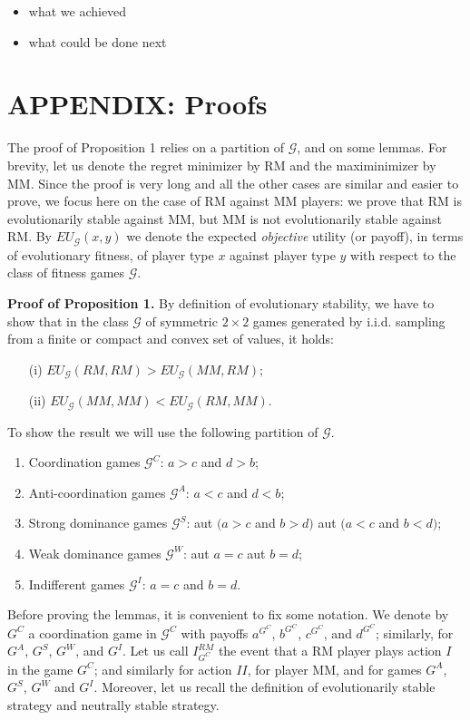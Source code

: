 \documentclass[fleqn,reqno,11pt]{article}
\begin{document}
\begin{itemize}
\item what we achieved
\item what could be done next
\end{itemize}











\section*{APPENDIX: Proofs}

The proof of Proposition 1 relies on a partition of $\mathcal{G}$,
and on some lemmas. For brevity, let us denote the regret minimizer
by RM and the maximinimizer by MM. Since the proof is very long and
all the other cases are similar and easier to prove, we focus here
on the case of RM against MM players: we prove that RM is evolutionarily
stable against MM, but MM is not evolutionarily stable against RM. By $EU_{\mathcal{G}}(x,y)$ we denote the expected \textit{objective} utility (or payoff), in terms
of evolutionary fitness, of player type $x$ against player type $y$
with respect to the class of fitness games $\mathcal{G}$. 

\medskip{}


\textbf{Proof of Proposition 1.} By definition of evolutionary stability, we have to
show that in the class $\mathcal{G}$ of symmetric $2\times2$ games generated by i.i.d. sampling
from a finite or compact and convex set of values, it holds:
\begin{itemize}
\item[(i)] $EU_{\mathcal{G}}(RM,RM)>EU_{\mathcal{G}}(MM,RM);$
\item[(ii)] $EU_{\mathcal{G}}(MM,MM)<EU_{\mathcal{G}}(RM,MM).$
\end{itemize}


\noindent To show
the result we will use the following partition of $\mathcal{G}$.
\begin{enumerate}
\item Coordination games $\mathcal{G}^{C}$: $a>c$ and $d>b$;
\item Anti-coordination games $\mathcal{G}^{A}$: $a<c$ and $d<b$;
\item Strong dominance games $\mathcal{G}^{S}$: aut $(a>c$ and $b>d)$
aut $(a<c$ and $b<d)$;
\item Weak dominance games $\mathcal{G}^{W}$: aut $a=c$ aut $b=d$;
\item Indifferent games $\mathcal{G}^{I}$: $a=c$ and $b=d$.
\end{enumerate}
Before proving the lemmas, it is convenient to fix some notation.
We denote by $G^{C}$ a coordination game in $\mathcal{G}^{C}$ with
payoffs $a^{G^{C}}$, $b^{G^{C}}$, $c^{G^{C}}$, and $d^{G^{C}}$;
similarly, for $G^{A}$, $G^{S}$, $G^{W}$, and $G^{I}$. Let us
call $I_{G^{C}}^{RM}$ the event that a RM player plays action $I$
in the game $G^{C}$; and similarly for action $II$, for player MM,
and for games $G^{A}$, $G^{S}$, $G^{W}$ and $G^{I}$. Moreover,
let us recall the definition of evolutionarily stable strategy and
neutrally stable strategy.
\end{document}
